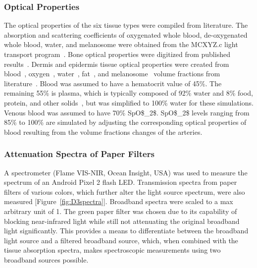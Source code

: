 \subsubsection{Optical Properties}
The optical properties of the six tissue types were compiled from literature. The absorption and scattering coefficients of oxygenated whole blood, de-oxygenated whole blood, water, and melanosome were obtained from the MCXYZ.c light transport program~\cite{JacquesMCXYZ}. Bone optical properties were digitized from published results~\cite{KonugoluVenkataSekar2016}. Dermis and epidermis tissue optical properties were created from blood~\cite{Prahl2012}, oxygen~\cite{Jacques2013}, water~\cite{Hale1973}, fat~\cite{VanVeen2004}, and melanosome~\cite{Jacques1991} volume fractions from literature~\cite{Jacques2013}. Blood was assumed to have a hematocrit value of 45\%. The remaining 55\% is plasma, which is typically composed of 92\% water and 8\% food, protein, and other solids~\cite{Jacques2013}, but was simplified to 100\% water for these simulations. Venous blood was assumed to have 70\% \ac{SpO$_2$}. \ac{SpO$_2$} levels ranging from 85\% to 100\% are simulated by adjusting the corresponding optical properties of blood resulting from the volume fractions changes of the arteries. 
        
\subsubsection{Attenuation Spectra of Paper Filters}
A spectrometer (Flame VIS-NIR, Ocean Insight, USA) was used to measure the spectrum of an Android Pixel 2 flash \ac{LED}. Transmission spectra from paper filters of various colors, which further alter the light source spectrum, were also measured [Figure~\ref{fig:D3spectra}]. Broadband spectra were scaled to a max arbitrary unit of 1. The green paper filter was chosen due to its capability of blocking near-infrared light while still not attenuating the original broadband light significantly. This provides a means to differentiate between the broadband light source and a filtered broadband source, which, when combined with the tissue absorption spectra, makes spectroscopic measurements using two broadband sources possible. 

